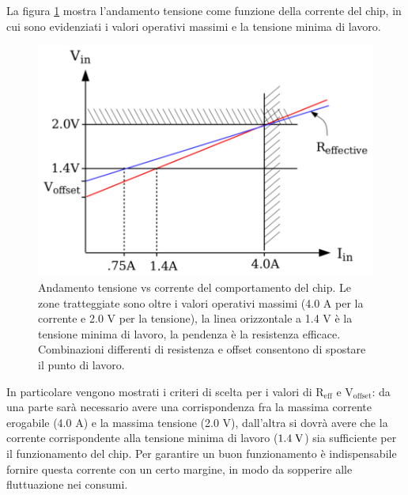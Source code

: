 La figura \ref{VVC} mostra l'andamento tensione come funzione della corrente del chip, in cui sono evidenziati i valori operativi massimi e la tensione minima di lavoro.
\begin{figure}[!htbp]
\centering
\includegraphics[scale=.3]{Immagini/VoltageVsCurrent}
\caption{Andamento tensione vs corrente del comportamento del chip. Le zone tratteggiate sono oltre i valori operativi massimi (4.0 A per la corrente e 2.0 V per la tensione), la linea orizzontale a 1.4 V è la tensione minima di lavoro, la pendenza è la resistenza efficace. Combinazioni differenti di resistenza e offset consentono di spostare il punto di lavoro.}
\label{VVC}
\end{figure}
In particolare vengono mostrati i criteri di scelta per i valori di $\mathrm{R_{eff}}$ e $\mathrm{V_{offset}}$: da una parte sarà necessario avere una corrispondenza fra la massima corrente erogabile (4.0 A) e la massima tensione (2.0 V), dall'altra si dovrà avere che la corrente corrispondente alla tensione minima di lavoro ($1.4 \rm \; V$) sia sufficiente per il funzionamento del chip.
Per garantire un buon funzionamento è indispensabile fornire questa corrente con un certo margine, in modo da sopperire alle fluttuazione nei consumi.

